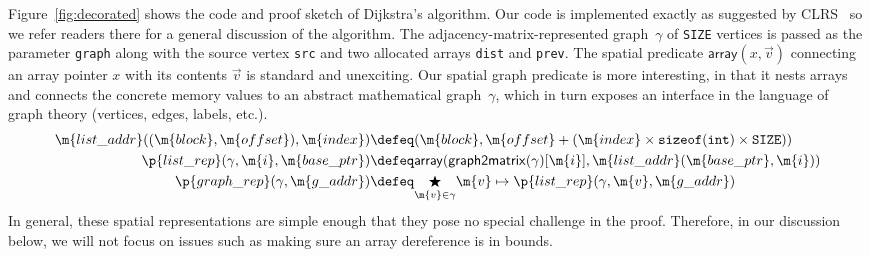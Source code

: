 

\vspace{-0.75em}

Figure~\ref{fig:decorated} shows the code and proof
sketch of Dijkstra's algorithm.  Our code is implemented exactly
as suggested by CLRS~\cite{clrs} so we refer readers there for a
general discussion of the algorithm.
The adjacency-matrix-represented graph~$\gamma$ of \texttt{SIZE} vertices
is passed as the parameter \texttt{graph} along with the source vertex \texttt{src}
and two allocated arrays \texttt{dist} and \texttt{prev}.
The spatial predicate $\mathsf{array}(x,\vec{v})$ connecting an array pointer $x$ with its contents $\vec{v}$ is standard and unexciting.
Our spatial graph predicate is more interesting, in
that it nests arrays and connects the concrete memory values to an abstract mathematical
graph~$\gamma$, which in turn exposes an interface in the language of graph theory
(vertices, edges, labels, etc.).
\vspace{-0.5em}
\begin{equation*}
\begin{split}
\m{list\_addr} ((\m{block}, \m{offset}), \m{index}) &\defeq
  (\m{block}, \m{offset} + (\m{index} \times \texttt{sizeof}(\texttt{int}) \times \texttt{SIZE})) \\
\p{list\_rep}(\gamma, \m{i}, \m{base\_ptr}) &\defeq \mathsf{array}(\mathsf{graph2matrix}(\gamma)[\m{i}], \m{list\_addr}(\m{base\_ptr}, \m{i})) \\
\vspace{1em}
\p{graph\_rep}(\gamma, \m{g\_addr}) &\defeq \underset{\m{v} \in \gamma}{\bigstar} \m{v}  \mapsto\p{list\_rep}(\gamma, \m{v}, \m{g\_addr})
\end{split}
\end{equation*}
In general, these spatial representations are simple enough that they pose no special
challenge in the proof. Therefore, in our discussion below, we will not focus on 
issues such as making sure an array dereference is in bounds.

